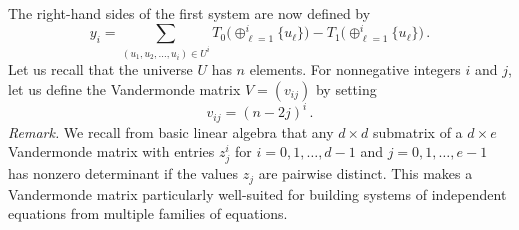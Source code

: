 \documentclass{amsart}
\begin{document}
The right-hand sides of the first system are now defined by
\begin{equation}
\label{eq:yi}
y_i=
\!\!\!\!\!\!\sum_{(u_1,u_2,\ldots,u_i)\in U^i}\!\!\!\!\!\!
T_0\bigl(\oplus_{\ell=1}^i\{u_\ell\}\bigr)
-T_1\bigl(\oplus_{\ell=1}^i\{u_\ell\}\bigr)\,.
\end{equation}
Let us recall that the universe $U$ has $n$ elements.
For nonnegative integers $i$ and $j$, let us define the
Vandermonde matrix $V=(v_{ij})$ by setting 
\begin{equation}
\label{eq:v}
v_{ij}=(n-2j)^i\,.
\end{equation}
{\em Remark.} We recall from basic linear algebra that 
any $d\times d$ submatrix of a $d\times e$ Vandermonde matrix 
with entries $z_j^i$ for $i=0,1,\ldots,d-1$ and $j=0,1,\ldots,e-1$ 
has nonzero determinant if the values $z_j$ are pairwise distinct. 
This makes a Vandermonde matrix particularly well-suited for 
building systems of independent equations from multiple families of equations.
\end{document}
